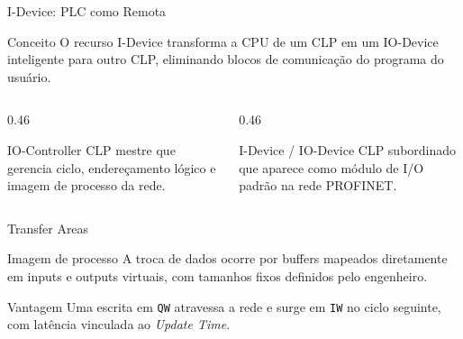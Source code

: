 \documentclass[10pt, aspectratio=169]{beamer}
\begin{document}
\begin{frame}{I-Device: PLC como Remota}
    \small
    \begin{block}{Conceito}
        O recurso I-Device transforma a CPU de um CLP em um IO-Device inteligente para outro CLP, eliminando blocos de comunica\c{c}\~ao do programa do usu\'ario.
    \end{block}

    \begin{columns}[T,totalwidth=\textwidth]
        \begin{column}{0.46\textwidth}
            \begin{block}{IO-Controller}
                CLP mestre que gerencia ciclo, endere\c{c}amento l\'ogico e imagem de processo da rede.
            \end{block}
        \end{column}
        \begin{column}{0.46\textwidth}
            \begin{block}{I-Device / IO-Device}
                CLP subordinado que aparece como m\'odulo de I/O padr\~ao na rede PROFINET.
            \end{block}
        \end{column}
    \end{columns}
\end{frame}

\begin{frame}{Transfer Areas}
    \small
    \begin{block}{Imagem de processo}
        A troca de dados ocorre por buffers mapeados diretamente em inputs e outputs virtuais, com tamanhos fixos definidos pelo engenheiro.
    \end{block}

    \centering

    \vspace{0.25cm}
    \begin{block}{Vantagem}
        Uma escrita em \texttt{QW} atravessa a rede e surge em \texttt{IW} no ciclo seguinte, com lat\^encia vinculada ao \textit{Update Time}.
    \end{block}
\end{frame}
\end{document}
